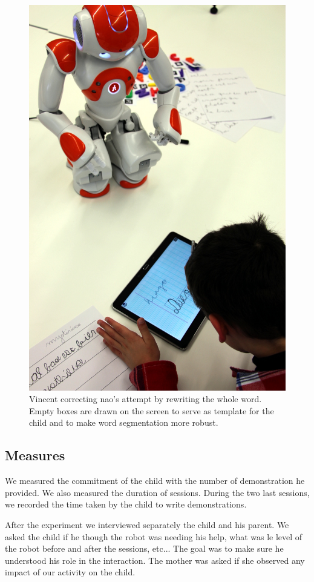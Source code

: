 \documentclass{sig-alternate}
\begin{document}
\begin{figure}
    \centering
    \includegraphics[width=0.5\linewidth]{diego}
    \caption{\small Vincent correcting {\sc nao}'s attempt by rewriting the
        whole word. Empty boxes are drawn on the screen to serve as template for the child
        and to make word segmentation more robust.}
    \label{fig:Vincent}
\end{figure}

\subsection{Measures}

We measured the commitment of the child with the number of demonstration he provided. We also measured the duration of sessions. During the two last sessions, we recorded the time taken by the child to write demonstrations.

After the experiment we interviewed separately the child and his parent. We asked the child if he though the robot was needing his help, what was le level of the robot before and after the sessions, etc... The goal was to make sure he understood his role in the interaction. The mother was asked if she observed any impact of our activity on the child. 
\end{document}
